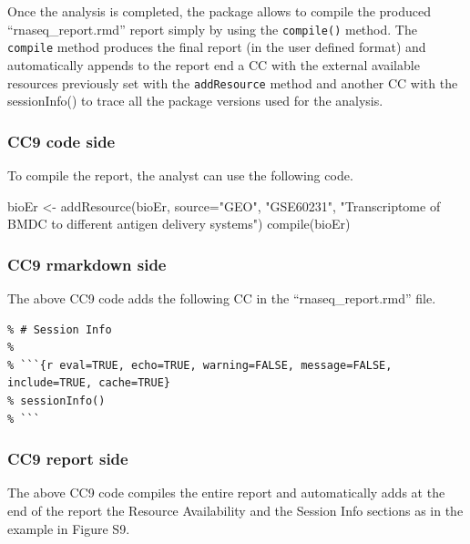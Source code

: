 \documentclass[
]{article}
\newenvironment{Shaded}{\begin{snugshade}}{\end{snugshade}}
\newcommand{\AttributeTok}[1]{\textcolor[rgb]{0.77,0.63,0.00}{#1}}
\newcommand{\FunctionTok}[1]{\textcolor[rgb]{0.00,0.00,0.00}{#1}}
\newcommand{\NormalTok}[1]{#1}
\newcommand{\OtherTok}[1]{\textcolor[rgb]{0.56,0.35,0.01}{#1}}
\newcommand{\StringTok}[1]{\textcolor[rgb]{0.31,0.60,0.02}{#1}}
\begin{document}
Once the analysis is completed, the package allows to compile the
produced ``rnaseq\_report.rmd'' report simply by using the
\texttt{compile()} method. The \texttt{compile} method produces the
final report (in the user defined format) and automatically appends to
the report end a CC with the external available resources previously set
with the \texttt{addResource} method and another CC with the
sessionInfo() to trace all the package versions used for the analysis.

\hypertarget{cc9-code-side}{%
\subsubsection{CC9 code side}\label{cc9-code-side}}

To compile the report, the analyst can use the following code.

\begin{Shaded}
\begin{Highlighting}[]
\NormalTok{bioEr }\OtherTok{\textless{}{-}} \FunctionTok{addResource}\NormalTok{(bioEr, }\AttributeTok{source=}\StringTok{"GEO"}\NormalTok{, }\StringTok{"GSE60231"}\NormalTok{, }\StringTok{"Transcriptome of BMDC to different antigen delivery systems"}\NormalTok{)}
\FunctionTok{compile}\NormalTok{(bioEr)}
\end{Highlighting}
\end{Shaded}

\newpage

\hypertarget{cc9-rmarkdown-side}{%
\subsubsection{CC9 rmarkdown side}\label{cc9-rmarkdown-side}}

The above CC9 code adds the following CC in the ``rnaseq\_report.rmd''
file.

\begin{verbatim}
% # Session Info
% 
% ```{r eval=TRUE, echo=TRUE, warning=FALSE, message=FALSE, include=TRUE, cache=TRUE}
% sessionInfo()
% ```
\end{verbatim}

\hypertarget{cc9-report-side}{%
\subsubsection{CC9 report side}\label{cc9-report-side}}

The above CC9 code compiles the entire report and automatically adds at
the end of the report the Resource Availability and the Session Info
sections as in the example in Figure S9.
\end{document}
